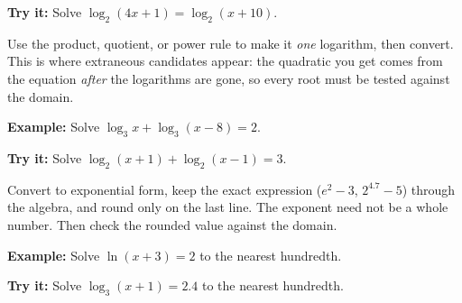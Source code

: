 \documentclass[12pt]{article}
\begin{document}
\begin{tryitbox}
\textbf{Try it:} \quad Solve $\log_2(4x + 1) = \log_2(x + 10)$.\\[2pt]
\end{tryitbox}


\begin{formulabox}
Use the product, quotient, or power rule to make it \emph{one} logarithm, then
convert. This is where extraneous candidates appear: the quadratic you get comes
from the equation \emph{after} the logarithms are gone, so every root must be
tested against the domain.
\end{formulabox}

\begin{examplebox}
\textbf{Example:} \quad Solve $\log_3 x + \log_3(x - 8) = 2$.
\end{examplebox}

\begin{tryitbox}
\textbf{Try it:} \quad Solve $\log_2(x + 1) + \log_2(x - 1) = 3$.\\[2pt]
\end{tryitbox}


\begin{formulabox}
Convert to exponential form, keep the exact expression ($e^2 - 3$, $2^{4.7} - 5$)
through the algebra, and round only on the last line. The exponent need not be a
whole number. Then check the rounded value against the domain.
\end{formulabox}

\begin{examplebox}
\textbf{Example:} \quad Solve $\ln(x + 3) = 2$ to the nearest hundredth.
\end{examplebox}

\begin{tryitbox}
\textbf{Try it:} \quad Solve $\log_3(x + 1) = 2.4$ to the nearest hundredth.\\[2pt]
\end{tryitbox}
\end{document}
